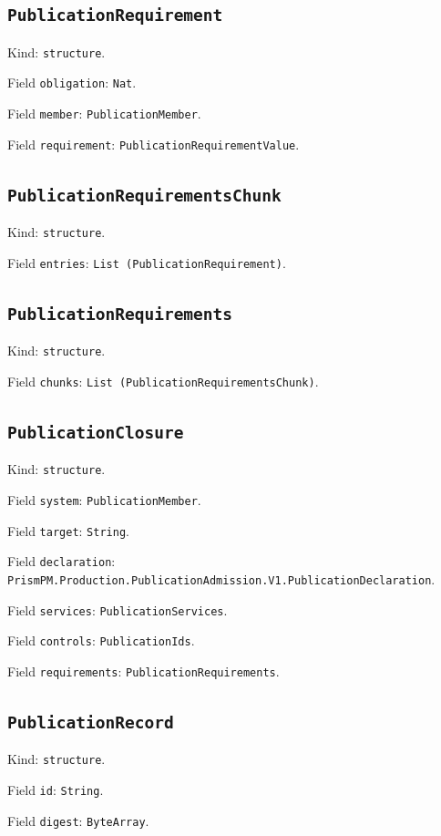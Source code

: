 \documentclass[11pt]{article}
\begin{document}
\subsection*{\texttt{PublicationRequirement}}
\noindent Kind: \texttt{structure}.\par
\noindent Field \texttt{obligation}: \texttt{Nat}.\par
\noindent Field \texttt{member}: \texttt{PublicationMember}.\par
\noindent Field \texttt{requirement}: \texttt{PublicationRequirementValue}.\par
\subsection*{\texttt{PublicationRequirementsChunk}}
\noindent Kind: \texttt{structure}.\par
\noindent Field \texttt{entries}: \texttt{List (PublicationRequirement)}.\par
\subsection*{\texttt{PublicationRequirements}}
\noindent Kind: \texttt{structure}.\par
\noindent Field \texttt{chunks}: \texttt{List (PublicationRequirementsChunk)}.\par
\subsection*{\texttt{PublicationClosure}}
\noindent Kind: \texttt{structure}.\par
\noindent Field \texttt{system}: \texttt{PublicationMember}.\par
\noindent Field \texttt{target}: \texttt{String}.\par
\noindent Field \texttt{declaration}: \texttt{PrismPM.Production.PublicationAdmission.V1.PublicationDeclaration}.\par
\noindent Field \texttt{services}: \texttt{PublicationServices}.\par
\noindent Field \texttt{controls}: \texttt{PublicationIds}.\par
\noindent Field \texttt{requirements}: \texttt{PublicationRequirements}.\par
\subsection*{\texttt{PublicationRecord}}
\noindent Kind: \texttt{structure}.\par
\noindent Field \texttt{id}: \texttt{String}.\par
\noindent Field \texttt{digest}: \texttt{ByteArray}.\par
\end{document}
